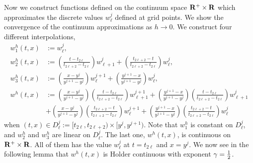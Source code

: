 \documentclass[11pt]{amsart}
\def\R{{\bf R}}
\def\R{{\bf R}}
\begin{document}
Now we construct functions defined on the continuum space $\R^+\times\R$ which approximates the discrete values $w^j_\ell$ defined at grid points.
We show the convergence of the continuum approximations as $h\to0$. We construct four different interpolations,
\begin{equation} \label{linear0}
\begin{aligned}
 w_1^h(t,x)&:= w^j_\ell,\\
 w_2^h(t,x)&:= \left(\tfrac{t-t_{2\ell}}{t_{2\ell+2}-t_{2\ell}} \right)
 w_{\ell+1}^{j} + \left(\tfrac{t_{2\ell+2}-t}{t_{2\ell+2}-t_{2\ell}} \right)
 w_{\ell}^{j},\\
 w_3^h(t,x)&:= \left(\tfrac{x-y^j}{y^{j+1}-y^j} \right) w_{\ell}^{j+1}
 + \left(\tfrac{y^{j+1}-x}{y^{j+1}-y^j} \right) w_{\ell}^{j},\\
  w^h(t,x)&:= \left(\tfrac{x-y^j}{y^{j+1}-y^j}
  \right)\left(\tfrac{t-t_{2\ell}}{t_{2\ell+2}-t_{2\ell}} \right)
  w_{\ell+1}^{j+1} + \left(\tfrac{y^{j+1}-x}{y^{j+1}-y^j}
  \right)\left(\tfrac{t-t_{2\ell}}{t_{2\ell+2}-t_{2\ell}} \right)
  w_{\ell+1}^{j}\\
 &+ \left(\tfrac{x-y^j}{y^{j+1}-y^j}
 \right)\left(\tfrac{t_{2\ell+2}-t}{t_{2\ell+2}-t_{2\ell}} \right)
 w_{\ell}^{j+1} + \left(\tfrac{y^{j+1}-x}{y^{j+1}-y^j}
 \right)\left(\tfrac{t_{2\ell+2}-t}{t_{2\ell+2}-t_{2\ell}} \right)
 w_{\ell}^{j}
  \end{aligned}
\end{equation}
when $(t,x)\in D_\ell^j:=[t_{2\ell}, t _{2\ell+2}) \times [y^j, y^{j+1})$. Note that $w_1^h$ is constant on $D_\ell^j$, and $w_2^h$ and $w_3^h$ are linear on $D_\ell^j$. The last one, $w^h(t,x)$, is continuous on $\R^+\times\R$. All of them has the value $w^j_\ell$ at $t=t_{2\ell}$ and $x=y^j$. We now see in the following lemma that $w^h(t,x)$ is Holder continuous with exponent $\gamma={1\over2}$.
\end{document}
